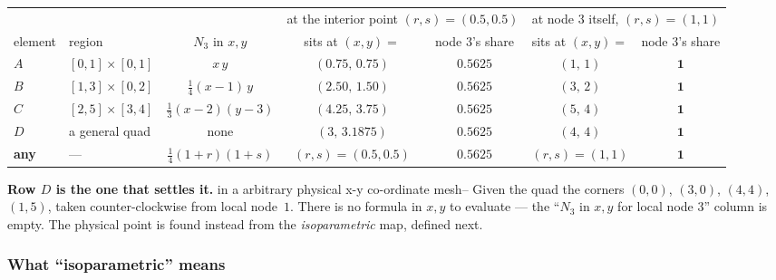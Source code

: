 \documentclass[11pt]{article}
\begin{document}
\begin{center}\footnotesize
\renewcommand{\arraystretch}{1.35}
\setlength{\tabcolsep}{4.5pt}
\begin{tabular}{@{}llccccc@{}}
\toprule
 & & & \multicolumn{2}{c}{at the interior point $(r,s)=(0.5,0.5)$}
     & \multicolumn{2}{c}{at node $3$ itself, $(r,s)=(1,1)$}\\
\cmidrule(lr){4-5}\cmidrule(lr){6-7}
element & region & $N_{3}$ in $x,y$ & sits at $(x,y)=$ & node $3$'s share & sits at $(x,y)=$ & node $3$'s share\\
\midrule
$A$ & $[0,1]\times[0,1]$ & $x\,y$                  & $(0.75,\,0.75)$   & $0.5625$ & $(1,\,1)$          & $\bm{1}$\\
$B$ & $[1,3]\times[0,2]$ & $\tfrac14(x-1)\,y$      & $(2.50,\,1.50)$   & $0.5625$ & $(3,\,2)$          & $\bm{1}$\\
$C$ & $[2,5]\times[3,4]$ & $\tfrac13(x-2)(y-3)$    & $(4.25,\,3.75)$   & $0.5625$ & $(5,\,4)$          & $\bm{1}$\\
$D$ & a general quad     & \textcolor{red!60!black}{none}
                                                   & $(3,\,3.1875)$ & $0.5625$ & $(4,\,4)$   & $\bm{1}$\\
\midrule
\textbf{any} & --- & $\tfrac14(1+r)(1+s)$ & $(r,s)=(0.5,0.5)$ & $\bm{0.5625}$ & $(r,s)=(1,1)$ & $\bm{1}$\\
\bottomrule
\end{tabular}
\label{tab:why}
\end{center}

\noindent
\textbf{Row $D$ is the one that settles it.} in a arbitrary physical x-y co-ordinate mesh--  Given the quad the corners 
$(0,0)$, $(3,0)$, $(4,4)$, $(1,5)$, taken counter-clockwise from
local node~$1$. There is no formula in $x,y$ to evaluate --- the ``$N_{3}$ in
$x,y$ for local node 3'' column is empty. The physical point is found instead from the
\emph{isoparametric} map, defined next.

\subsubsection*{What ``isoparametric'' means}
\end{document}
